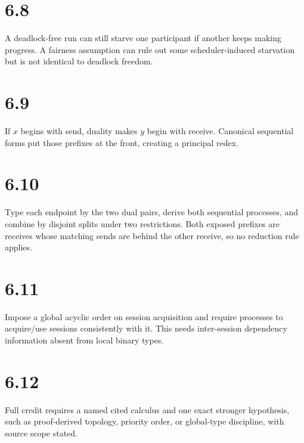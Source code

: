 \section*{6.8}
A deadlock-free run can still starve one participant if another keeps making progress. A fairness assumption can rule out some scheduler-induced starvation but is not identical to deadlock freedom.

\section*{6.9}
If $x$ begins with send, duality makes $y$ begin with receive. Canonical sequential forms put those prefixes at the front, creating a principal redex.

\section*{6.10}
Type each endpoint by the two dual pairs, derive both sequential processes, and combine by disjoint splits under two restrictions. Both exposed prefixes are receives whose matching sends are behind the other receive, so no reduction rule applies.

\section*{6.11}
Impose a global acyclic order on session acquisition and require processes to acquire/use sessions consistently with it. This needs inter-session dependency information absent from local binary types.

\section*{6.12}
Full credit requires a named cited calculus and one exact stronger hypothesis, such as proof-derived topology, priority order, or global-type discipline, with source scope stated.
